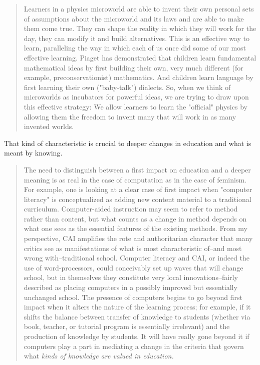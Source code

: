 \begin{quotation}
Learners in a physics microworld are able to invent their own personal sets of
assumptions about the microworld and its laws and are able to make them come
true.  They can shape the reality in which they will work for the day, they can
modify it and build alternatives.  This is an effective way to learn,
paralleling the way in which each of us once did some of our most effective
learning. Piaget has demonstrated that children learn fundamental mathematical
ideas by first building their own, very much different (for example,
preconservationist) mathematics. And children learn language by first learning
their own ("baby-talk") dialects. So, when we think of microworlds as incubators
for powerful ideas, we are trying to draw upon this effective strategy: We allow
learners to learn the "official" physics by allowing them the freedom to invent
many that will work in as many invented worlds.
\cite{education:papert_mindstorms}
\end{quotation}

That kind of characteristic is crucial to deeper changes in education and what
is meant by knowing. 

\begin{quotation}
The need to distinguish between a first impact on education and a deeper meaning
is as real in the case of computation as in the case of feminism. For example,
one is looking at a clear case of first impact when "computer literacy" is
conceptualized as adding new content material to a traditional curriculum.
Computer-aided instruction may seem to refer to method rather than content, but
what counts as a change in method depends on what one sees as the essential
features of the existing methods. From my perspective, CAI amplifies the rote
and authoritarian character that many critics see as manifestations of what is
most characteristic of--and most wrong with--traditional school. Computer
literacy and CAI, or indeed the use of word-processors, could conceivably set up
waves that will change school, but in themselves they constitute very local
innovations--fairly described as placing computers in a possibly improved but
essentially unchanged school. The presence of computers begins to go beyond
first impact when it alters the nature of the learning process; for example, if
it shifts the balance between transfer of knowledge to students (whether via
book, teacher, or tutorial program is essentially irrelevant) and the production
of knowledge by students. It will have really gone beyond it if computers play a
part in mediating a change in the criteria that govern what \emph{kinds of knowledge
are valued in education.} 
\cite{education:papert__situating_constructionism}
\end{quotation}



